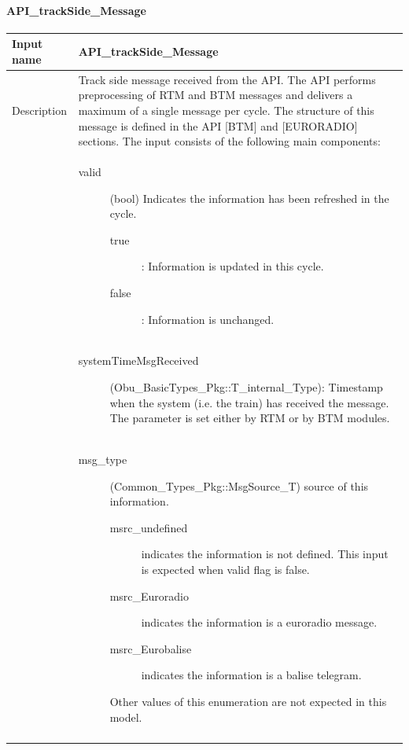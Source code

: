 \paragraph{API\_trackSide\_Message}

\begin{longtable}{p{}p{}}
\toprule
Input name				& API\_trackSide\_Message \\
\midrule
Description				& Track side message received from the API. The API performs preprocessing of RTM and BTM messages and delivers a maximum of a single message per cycle. The structure of this message is defined in the API [BTM] and [EURORADIO] sections. The input consists of the following main components:\\
&
\begin{description}
\item[valid](bool) Indicates the information has been refreshed in the cycle.
\begin{description}
\item[true]: Information is updated in this cycle.
\item[false]: Information is unchanged.
\end{description}
\end{description}\\
&
\begin{description}
\item[systemTimeMsgReceived](Obu\_BasicTypes\_Pkg::T\_internal\_Type): Timestamp when the system (i.e. the train) has received the message. The parameter is set either by RTM or by BTM modules.
\end{description}\\
&
\begin{description}
\item[msg\_type](Common\_Types\_Pkg::MsgSource\_T) source of this information. 
\begin{description}
\item[msrc\_undefined] indicates the information is not defined. This input is expected when valid flag is false.
\item[msrc\_Euroradio] indicates the information is a euroradio message.
\item[msrc\_Eurobalise] indicates the information is a balise telegram.
\end{description}
Other values of this enumeration are not expected in this model.
\end{description}\\
&
\begin{description}

\end{description}
\end{longtable}
